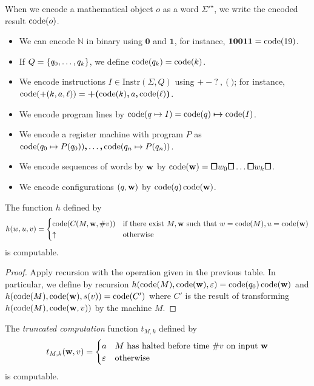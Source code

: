When we encode a mathematical object \( o \) as a word \( \Sigma'^\star \), we write the encoded result \( \operatorname{code}(o) \).
\begin{itemize}
	\item We can encode \( \mathbb N \) in binary using \( \bm 0 \) and \( \bm 1 \), for instance, \( \bm 1 \bm 0 \bm 0 \bm 1 \bm 1 = \operatorname{code}(19) \).
	\item If \( Q = \qty{q_0, \dots, q_k} \), we define \( \operatorname{code}(q_k) = \operatorname{code}(k) \).
	\item We encode instructions \( I \in \mathrm{Instr}(\Sigma, Q) \) using \( \bm +\ \bm -\ \bm ?\ \bm ,\ \bm (\ \bm ) \); for instance, \( \operatorname{code}(+(k,a,\ell)) = \bm +\bm(\operatorname{code}(k)\bm , a\bm ,\operatorname{code}(\ell)\bm ) \).
	\item We encode program lines by \( \operatorname{code}(q \mapsto I) = \operatorname{code}(q) \bm \mapsto \operatorname{code}(I) \).
	\item We encode a register machine with program \( P \) as \( \operatorname{code}(q_0 \mapsto P(q_0)) \bm , \ldots \bm , \operatorname{code}(q_n \mapsto P(q_n)) \).
	\item We encode sequences of words by \( \vb w \) by \( \operatorname{code}(\vb w) = \bm\square w_0 \bm\square \ldots \bm\square w_k \bm\square \).
	\item We encode configurations \( (q, \vb w) \) by \( \operatorname{code}(q)\operatorname{code}(\vb w) \).
\end{itemize}
\begin{lemma}
	The function \( h \) defined by
	\[ h(w,u,v) = \begin{cases}
		\operatorname{code}(C(M,\vb w,\# v)) & \text{if there exist } M, \vb w \text{ such that } w = \operatorname{code}(M), u = \operatorname{code}(\vb w) \\
		\uparrow & \text{otherwise}
	\end{cases} \]
	is computable.
\end{lemma}
\begin{proof}
	Apply recursion with the operation given in the previous table.
	In particular, we define by recursion \( h(\operatorname{code}(M), \operatorname{code}(\vb w), \varepsilon) = \operatorname{code}(q_0)\operatorname{code}(\vb w) \) and \( h(\operatorname{code}(M), \operatorname{code}(\vb w), s(v)) = \operatorname{code}(C') \) where \( C' \) is the result of transforming \( h(\operatorname{code}(M), \operatorname{code}(\vb w, v)) \) by the machine \( M \).
\end{proof}
\begin{corollary}
	The \emph{truncated computation} function \( t_{M,k} \) defined by
	\[ t_{M,k}(\vb w, v) = \begin{cases}
		a & M \text{ has halted before time } \#v \text{ on input } \vb w \\
		\varepsilon & \text{otherwise}
	\end{cases} \]
	is computable.
\end{corollary}
